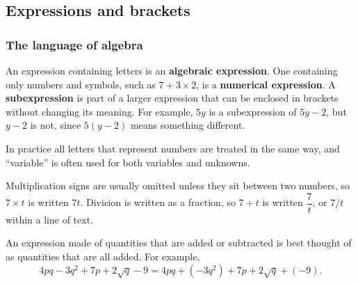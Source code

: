 \subsection{Expressions and brackets}

\subsubsection{The language of algebra}


An expression containing letters is an \textbf{algebraic expression}. One containing only numbers and symbols, such as $7 + 3 \times 2$, is a \textbf{numerical expression}. A \textbf{subexpression} is part of a larger expression that can be enclosed in brackets without changing its meaning. For example, $5y$ is a subexpression of $5y - 2$, but $y - 2$ is not, since $5(y - 2)$ means something different.


In practice all letters that represent numbers are treated in the same way, and ``variable'' is often used for both variables and unknowns.

Multiplication signs are usually omitted unless they sit between two numbers, so $7 \times t$ is written $7t$. Division is written as a fraction, so $7 \div t$ is written $\dfrac{7}{t}$, or $7/t$ within a line of text.


An expression made of quantities that are added or subtracted is best thought of as quantities that are all added. For example,
\[ 4pq - 3q^{2} + 7p + 2\sqrt{q} - 9 = 4pq + (-3q^{2}) + 7p + 2\sqrt{q} + (-9). \]

